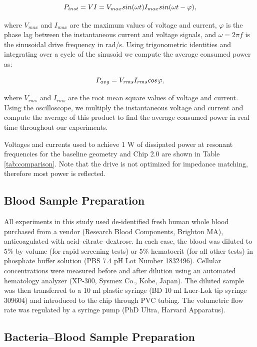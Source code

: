 \begin{equation}
\label{eqn:instpower}
\hfill P_{inst} = VI = V_{max}sin(\omega t) I_{max} sin(\omega t-\varphi),\hfill
\end{equation}

\noindent where $V_{max}$ and $I_{max}$ are the maximum values of voltage and current, $\varphi$ is the phase lag between the instantaneous current and voltage signals, and $\omega=2\pi f$ is the sinusoidal drive frequency in rad/s. Using trigonometric identities and integrating over a cycle of the sinusoid we compute the average consumed power as:

\begin{equation}
\label{eqn:avgpower}
\hfill P_{avg} = V_{rms}I_{rms}cos\varphi,\hfill
\end{equation}

\noindent where $V_{rms}$ and $I_{rms}$ are the root mean square values of voltage and current. Using the oscilloscope, we multiply the instantaneous voltage and current and compute the average of this product to find the average consumed power in real time throughout our experiments.

Voltages and currents used to achieve 1 W of dissipated power at resonant frequencies for the baseline geometry and Chip 2.0 are shown in Table \ref{tab:comparison}. Note that the drive is not optimized for impedance matching, therefore most power is reflected.
\subsection{Blood Sample Preparation}
All experiments in this study used de-identified fresh human whole blood purchased from a vendor (Research Blood Components, Brighton MA), anticoagulated with acid–citrate–dextrose. In each case, the blood was diluted to 5\% by volume (for rapid screening tests) or 5\% hematocrit (for all other tests) in phosphate buffer solution (PBS 7.4 pH Lot Number 1832496). Cellular concentrations were measured before and after dilution using an automated hematology analyzer (XP-300, Sysmex Co., Kobe, Japan). The diluted sample was then transferred to a 10 ml plastic syringe (BD 10 ml Luer-Lok tip syringe 309604) and introduced to the chip through PVC tubing. The volumetric flow rate was regulated by a syringe pump (PhD Ultra, Harvard Apparatus).

\subsection{Bacteria--Blood Sample Preparation}

